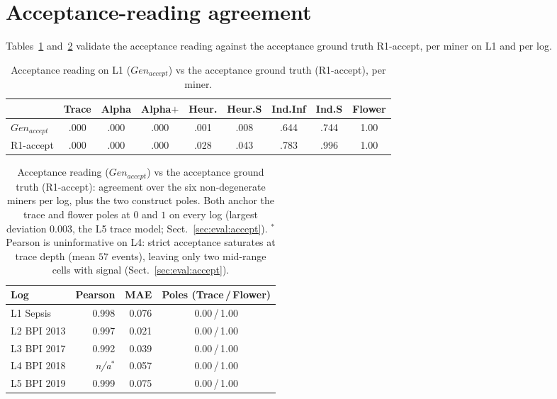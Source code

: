 \documentclass[runningheads]{llncs}
\newcommand{\genaccept}{\ensuremath{\mathit{Gen}_{\mathit{accept}}}}
\begin{document}
\section{Acceptance-reading agreement}
\label{sec:appendix:accept}
Tables~\ref{tab:accept} and~\ref{tab:accept-scale} validate the acceptance reading against the acceptance ground truth R1-accept, per miner on L1 and per log.
\begin{table}[!ht]
\centering
\caption{Acceptance reading on L1 (\genaccept) vs the acceptance ground truth (R1-accept), per miner.}
\label{tab:accept}
\setlength{\tabcolsep}{3.5pt}
\footnotesize
\begin{tabular}{@{}lcccccccc@{}}
\toprule
 & Trace & Alpha & Alpha$+$ & Heur. & Heur.S & Ind.Inf & Ind.S & Flower \\
\midrule
\genaccept{} & .000 & .000 & .000 & .001 & .008 & .644 & .744 & 1.00 \\
R1-accept & .000 & .000 & .000 & .028 & .043 & .783 & .996 & 1.00 \\
\bottomrule
\end{tabular}
\end{table}

\begin{table}[!ht]
\centering
\caption{Acceptance reading (\genaccept) vs the acceptance ground truth (R1-accept): agreement over the six non-degenerate miners per log, plus the two construct poles. Both anchor the trace and flower poles at $0$ and $1$ on every log (largest deviation $0.003$, the L5 trace model; Sect.~\ref{sec:eval:accept}). $^{*}$Pearson is uninformative on L4: strict acceptance saturates at trace depth (mean $57$ events), leaving only two mid-range cells with signal (Sect.~\ref{sec:eval:accept}).}
\label{tab:accept-scale}
\setlength{\tabcolsep}{6pt}
\footnotesize
\begin{tabular}{@{}lrrc@{}}
\toprule
Log & Pearson & MAE & Poles (Trace\,/\,Flower) \\
\midrule
L1 Sepsis   & 0.998 & 0.076 & 0.00\,/\,1.00 \\
L2 BPI 2013 & 0.997 & 0.021 & 0.00\,/\,1.00 \\
L3 BPI 2017 & 0.992 & 0.039 & 0.00\,/\,1.00 \\
L4 BPI 2018 & \emph{n/a}$^{*}$ & 0.057 & 0.00\,/\,1.00 \\
L5 BPI 2019 & 0.999 & 0.075 & 0.00\,/\,1.00 \\
\bottomrule
\end{tabular}
\end{table}
\end{document}
